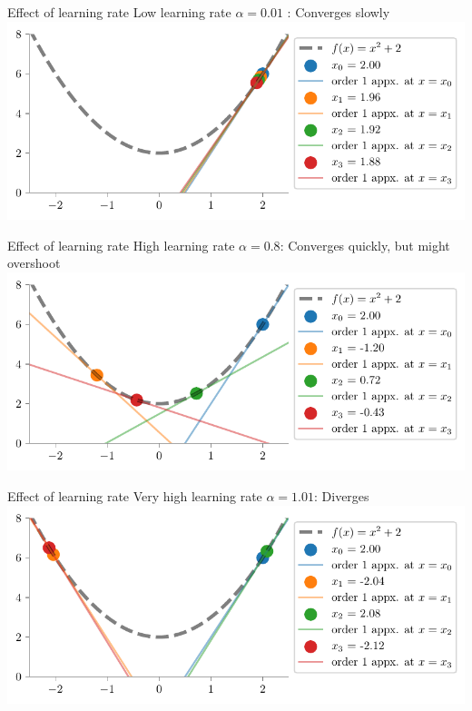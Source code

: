 \documentclass[usenames,dvipsnames]{beamer}
\begin{document}
  \begin{frame}{Effect of learning rate}
    Low learning rate $\alpha=0.01$ : Converges slowly
    \includegraphics[scale=0.8]{../../maths/assets/mathematical-ml/figures/gd-lr-0.01.pdf}
  \end{frame}

  \begin{frame}{Effect of learning rate}
    High learning rate $\alpha=0.8$: Converges quickly, but might overshoot
    \includegraphics[scale=0.8]{../../maths/assets/mathematical-ml/figures/gd-lr-0.8.pdf}
  \end{frame}

    \begin{frame}{Effect of learning rate}
        Very high learning rate $\alpha=1.01$: Diverges
        \includegraphics[scale=0.8]{../../maths/assets/mathematical-ml/figures/gd-lr-1.01.pdf}
    \end{frame}
\end{document}
